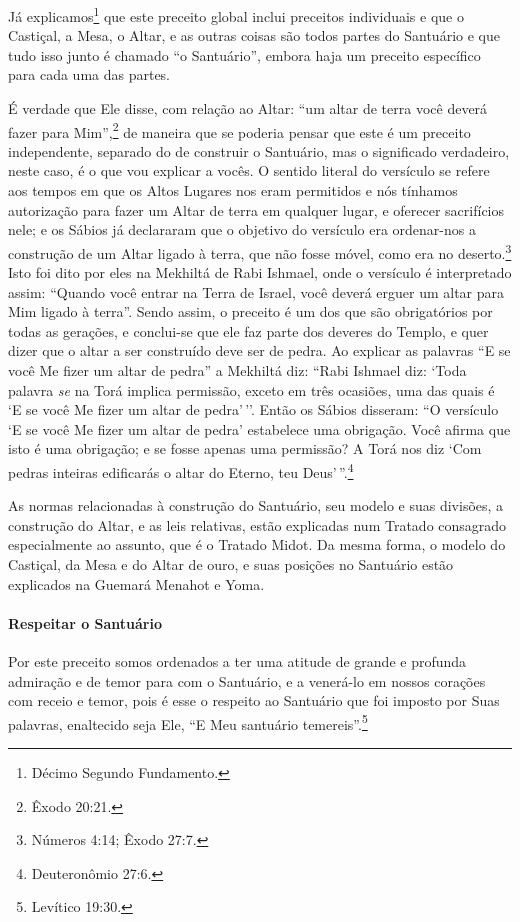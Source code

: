 Já explicamos\footnote{Décimo Segundo Fundamento.} que este preceito global inclui
preceitos individuais e que o Castiçal, a Mesa, o Altar, e as outras coisas são todos partes do Santuário e que tudo isso junto é chamado ``o Santuário'', embora
haja um preceito específico para cada uma das partes.

É verdade que Ele disse, com relação ao Altar: ``um altar de terra você
deverá fazer para Mim'',\footnote{Êxodo 20:21.} de maneira que se poderia pensar
que este é um preceito independente, separado do de construir o
Santuário, mas o significado verdadeiro, neste caso, é o que vou
explicar a vocês. O sentido literal do versículo se refere aos tempos
em que os Altos Lugares nos eram permitidos e nós tínhamos autorização
para fazer um Altar de terra em qualquer lugar, e oferecer sacrifícios
nele; e os Sábios já declararam que o objetivo do versículo era
ordenar-nos a construção de um Altar ligado à terra, que não fosse
móvel, como era no deserto.\footnote{Números 4:14; Êxodo 27:7.} Isto foi dito por eles
na Mekhiltá de Rabi Ishmael, onde o versículo é interpretado assim:
``Quando você entrar na Terra de Israel, você deverá erguer um altar
para Mim ligado à terra''. Sendo assim, o preceito é um dos que são
obrigatórios por todas as gerações, e conclui-se que ele faz parte dos
deveres do Templo, e quer dizer que o altar a ser construído deve ser
de pedra. Ao explicar as palavras ``E se você Me fizer um altar de
pedra'' a Mekhiltá diz: ``Rabi Ishmael diz: `Toda palavra \emph{se} na
Torá implica permissão, exceto em três ocasiões, uma das quais é `E se
você Me fizer um altar de pedra'\,''. Então os Sábios disseram: ``O
versículo `E se você Me fizer um altar de pedra' estabelece uma
obrigação. Você afirma que isto é uma obrigação; e se fosse apenas uma
permissão? A Torá nos diz `Com pedras inteiras edificarás o altar do
Eterno, teu Deus'\,''.\footnote{Deuteronômio 27:6.}

As normas relacionadas à construção do Santuário, seu modelo e suas
divisões, a construção do Altar, e as leis relativas, estão explicadas
num Tratado consagrado especialmente ao assunto, que é o Tratado Midot.
Da mesma forma, o modelo do Castiçal, da Mesa e do Altar de ouro, e suas
posições no Santuário estão explicados na Guemará Menahot e Yoma.

\paragraph{Respeitar o Santuário}

Por este preceito somos ordenados a ter uma atitude de grande e profunda
admiração e de temor para com o Santuário, e a venerá-lo em nossos
corações com receio e temor, pois é esse o respeito ao Santuário que foi
imposto por Suas palavras, enaltecido seja Ele, ``E Meu santuário
temereis''.\footnote{Levítico 19:30.}

